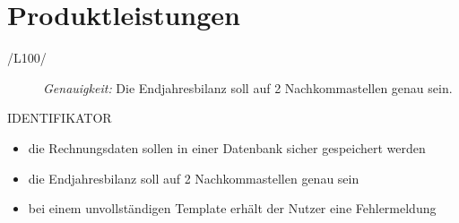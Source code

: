 
\section{Produktleistungen}

\begin{description}
  \item[/L100/]
    \textit{Genauigkeit:}
    	Die Endjahresbilanz soll auf 2 Nachkommastellen genau sein.
\end{description}

IDENTIFIKATOR
\begin{itemize}
	\item die Rechnungsdaten sollen in einer Datenbank sicher gespeichert werden
	\item die Endjahresbilanz soll auf 2 Nachkommastellen genau sein
	\item bei einem unvollständigen Template erhält der Nutzer eine Fehlermeldung
\end{itemize}

